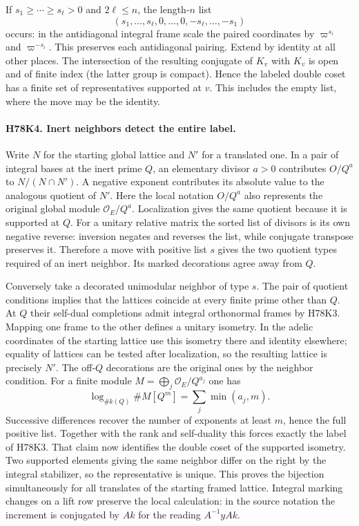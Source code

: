 If $s_1\ge\cdots\ge s_\ell>0$ and $2\ell\le n$, the length-$n$
list
\[
   (s_1,\ldots,s_\ell,0,\ldots,0,-s_\ell,\ldots,-s_1)
\]
occurs: in the antidiagonal integral frame scale the paired
coordinates by $\varpi^{s_i}$ and $\varpi^{-s_i}$.
This preserves each antidiagonal pairing. Extend by identity at
all other places. The intersection of the resulting conjugate of
$K_v$ with $K_v$ is open and of finite index (the latter group is
compact). Hence the labeled double coset has a finite set of
representatives supported at $v$. This includes the empty list,
where the move may be the identity.

\paragraph{H78K4. Inert neighbors detect the entire label.}
Write $N$ for the starting global lattice and $N'$ for a translated
one. In a pair of integral bases at the inert prime $Q$, an elementary
divisor $a>0$ contributes $O/Q^a$ to $N/(N\cap N')$.
A negative exponent contributes its absolute value to the analogous
quotient of $N'$. Here the local notation $O/Q^a$ also represents
the original global module $\mathcal O_E/Q^a$. Localization gives
the same quotient because it is supported at $Q$.
For a unitary relative matrix the sorted list of divisors is its
own negative reverse: inversion negates and reverses the list,
while conjugate transpose preserves it. Therefore a move with
positive list $s$ gives the two quotient types required of an
inert neighbor. Its marked decorations agree away from $Q$.

Conversely take a decorated unimodular neighbor of type $s$.
The pair of quotient conditions implies that the lattices coincide
at every finite prime other than $Q$. At $Q$ their self-dual
completions admit integral orthonormal frames by H78K3. Mapping
one frame to the other defines a unitary isometry. In the adelic
coordinates of the starting lattice use this isometry there and
identity elsewhere; equality of lattices can be tested after
localization, so the resulting lattice is precisely $N'$. The
off-$Q$ decorations are the original ones by the neighbor condition.
For a finite module $M=\bigoplus_j\mathcal O_E/Q^{a_j}$ one has
\[
 \log_{\#k(Q)}\# M[Q^m]=\sum_j\min(a_j,m).
\]
Successive differences recover the number of exponents at least
$m$, hence the full positive list. Together with the rank and
self-duality this forces exactly the label of H78K3. That claim
now identifies the double coset of the supported isometry. Two
supported elements giving the same neighbor differ on the right by
the integral stabilizer, so the representative is unique. This
proves the bijection simultaneously for all translates of the
starting framed lattice. Integral marking changes on a lift row
preserve the local calculation: in the source notation the increment
is conjugated by $Ak$ for the reading $A^{-1}yAk$.


